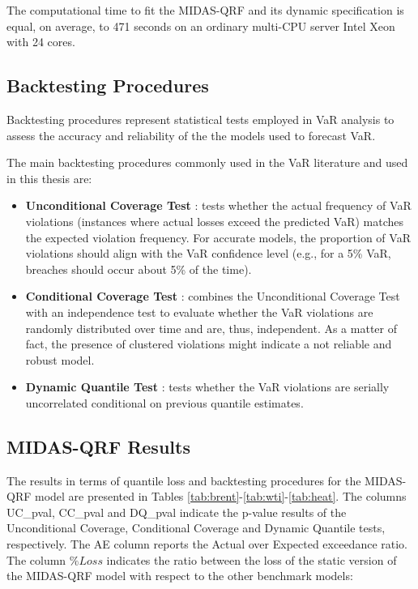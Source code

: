 \begin{landscape}
    
\end{landscape}

\noindent The computational time to fit the MIDAS-QRF and its dynamic specification is equal, on average, to 471 seconds on an ordinary multi-CPU server Intel Xeon with 24 cores.

\subsection{Backtesting Procedures}

Backtesting procedures represent statistical tests employed in VaR analysis to assess the accuracy and reliability of the the models used to forecast VaR.

\noindent The main backtesting procedures commonly used in the VaR literature and used in this thesis are:

\begin{itemize}
    \item \textbf{Unconditional Coverage Test} \citep{kupiec1995techniques}: tests whether the actual frequency of VaR violations (instances where actual losses exceed the predicted VaR) matches the expected violation frequency. For accurate models, the proportion of VaR violations should align with the VaR confidence level (e.g., for a 5\% VaR, breaches should occur about 5\% of the time).

    \item \textbf{Conditional Coverage Test} \citep{christoffersen1998evaluating}: combines the Unconditional Coverage Test with an independence test to evaluate whether the VaR violations are randomly distributed over time and are, thus, independent. As a matter of fact, the presence of clustered violations might indicate a not reliable and robust model. 

\item \textbf{Dynamic Quantile Test} \citep{Manganelli:2004}: tests whether the VaR violations are serially uncorrelated conditional on previous quantile estimates. 
\end{itemize}

\subsection{MIDAS-QRF Results}
The results in terms of quantile loss and backtesting procedures for the MIDAS-QRF model are presented in Tables \ref{tab:brent}-\ref{tab:wti}-\ref{tab:heat}. The columns UC\_pval, CC\_pval and DQ\_pval indicate the p-value results of the Unconditional Coverage, Conditional Coverage and Dynamic Quantile tests, respectively. The AE column reports the Actual over Expected exceedance ratio. The column $\%Loss$ indicates the ratio between the loss of the static version of the MIDAS-QRF model with respect to the other benchmark models:

